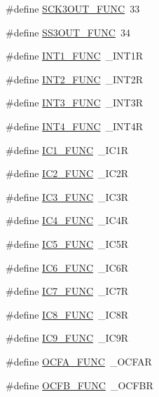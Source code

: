 \begin{DoxyCompactItemize}
\item 
\#define \hyperlink{pps-macro_8h_a2baee3bab2ed070c25bdcd6d7d47d0d0}{S\+C\+K3\+O\+U\+T\+\_\+\+F\+U\+N\+C}~33
\item 
\#define \hyperlink{pps-macro_8h_a5efd13ee0920fcb7e308d91d6ef218c9}{S\+S3\+O\+U\+T\+\_\+\+F\+U\+N\+C}~34
\item 
\#define \hyperlink{pps-macro_8h_a111e7cf170648c90459233189fb55d41}{I\+N\+T1\+\_\+\+F\+U\+N\+C}~\+\_\+\+I\+N\+T1\+R
\item 
\#define \hyperlink{pps-macro_8h_a38841437206d0d323476b88edfe49352}{I\+N\+T2\+\_\+\+F\+U\+N\+C}~\+\_\+\+I\+N\+T2\+R
\item 
\#define \hyperlink{pps-macro_8h_a37bf9fb8efd1d74a11e1090a7be58c06}{I\+N\+T3\+\_\+\+F\+U\+N\+C}~\+\_\+\+I\+N\+T3\+R
\item 
\#define \hyperlink{pps-macro_8h_af35632208dd67995b022ea15b5fd3b95}{I\+N\+T4\+\_\+\+F\+U\+N\+C}~\+\_\+\+I\+N\+T4\+R
\item 
\#define \hyperlink{pps-macro_8h_a3a820c64da729baa73743ba1269f2eae}{I\+C1\+\_\+\+F\+U\+N\+C}~\+\_\+\+I\+C1\+R
\item 
\#define \hyperlink{pps-macro_8h_ab14cb9038de1835a2db9876e0b2de15e}{I\+C2\+\_\+\+F\+U\+N\+C}~\+\_\+\+I\+C2\+R
\item 
\#define \hyperlink{pps-macro_8h_a1dca6342de2eeb3ea17c361a3715aeac}{I\+C3\+\_\+\+F\+U\+N\+C}~\+\_\+\+I\+C3\+R
\item 
\#define \hyperlink{pps-macro_8h_a5633cc87f170e2c7075d45e2da2f1cd7}{I\+C4\+\_\+\+F\+U\+N\+C}~\+\_\+\+I\+C4\+R
\item 
\#define \hyperlink{pps-macro_8h_ab772871aeb3b6c2a912a374e86fafa77}{I\+C5\+\_\+\+F\+U\+N\+C}~\+\_\+\+I\+C5\+R
\item 
\#define \hyperlink{pps-macro_8h_a233123e0add4fc17580fb28249380f1a}{I\+C6\+\_\+\+F\+U\+N\+C}~\+\_\+\+I\+C6\+R
\item 
\#define \hyperlink{pps-macro_8h_abf96da1eda3c35684e8915f1a307d3a6}{I\+C7\+\_\+\+F\+U\+N\+C}~\+\_\+\+I\+C7\+R
\item 
\#define \hyperlink{pps-macro_8h_a17bc23098824aeee2d72adea041f0cba}{I\+C8\+\_\+\+F\+U\+N\+C}~\+\_\+\+I\+C8\+R
\item 
\#define \hyperlink{pps-macro_8h_a6a201842d0e759324a15a51e34cdab88}{I\+C9\+\_\+\+F\+U\+N\+C}~\+\_\+\+I\+C9\+R
\item 
\#define \hyperlink{pps-macro_8h_afb2a7aefaae241839563723bc087ab72}{O\+C\+F\+A\+\_\+\+F\+U\+N\+C}~\+\_\+\+O\+C\+F\+A\+R
\item 
\#define \hyperlink{pps-macro_8h_a5e98a9c8cd4f3a6a464c9407c21b793e}{O\+C\+F\+B\+\_\+\+F\+U\+N\+C}~\+\_\+\+O\+C\+F\+B\+R

\end{DoxyCompactItemize}
